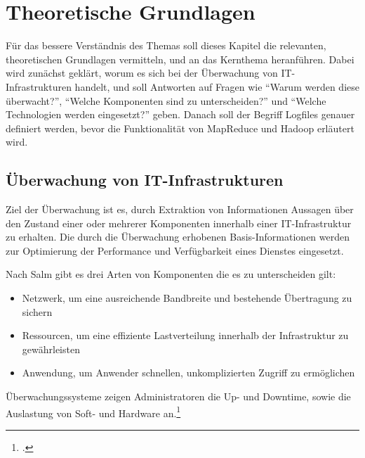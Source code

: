 
\chapter{Theoretische Grundlagen}\label{cha:Grundlagen}
Für das bessere Verständnis des Themas soll dieses Kapitel die relevanten, theoretischen Grundlagen vermitteln,  und an das Kernthema heranführen. Dabei wird zunächst geklärt, worum es sich bei der Überwachung von IT-Infrastrukturen handelt, und soll Antworten auf Fragen wie "`Warum werden diese überwacht?"', "`Welche Komponenten sind zu unterscheiden?"' und "`Welche Technologien werden eingesetzt?"' geben. Danach soll der Begriff Logfiles genauer definiert werden, bevor die Funktionalität von MapReduce und Hadoop erläutert wird.



\section{Überwachung von IT-Infrastrukturen}\label{sec:UeberwachungIT}
Ziel der Überwachung ist es, durch Extraktion von Informationen Aussagen über den Zustand einer oder mehrerer Komponenten innerhalb einer IT-Infrastruktur zu erhalten. Die durch die Überwachung erhobenen Basis-Informationen werden zur Optimierung der Performance und Verfügbarkeit eines Dienstes eingesetzt.

Nach Salm gibt es drei Arten von Komponenten die es zu unterscheiden gilt:

\begin{itemize}
	\item Netzwerk, um eine ausreichende Bandbreite und bestehende Übertragung zu sichern
	\item Ressourcen, um eine effiziente Lastverteilung innerhalb der Infrastruktur zu gewährleisten
	\item Anwendung, um Anwender schnellen, unkomplizierten Zugriff zu ermöglichen
\end{itemize}

Überwachungssysteme zeigen Administratoren die Up- und Downtime, sowie die Auslastung von Soft- und Hardware an.\footcite[Vgl.][S. 8]{Salm.2007}


